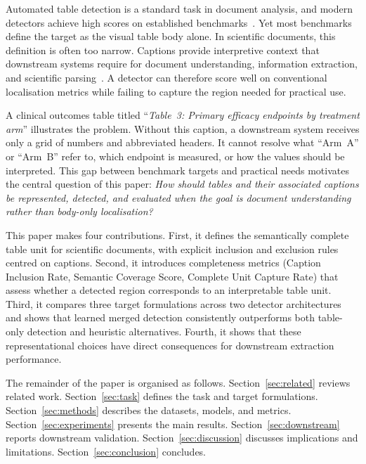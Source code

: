 \documentclass[pdflatex,sn-mathphys-num,iicol]{sn-jnl}
\begin{document}
Automated table detection is a standard task in document analysis, and modern
detectors achieve high scores on established
benchmarks~\cite{smock2022pubtables,hashmi2021survey}. Yet most benchmarks define the
target as the visual table body alone. In scientific documents, this definition is
often too narrow. Captions provide interpretive context that downstream systems
require for document understanding, information extraction, and scientific
parsing~\cite{marshall2019toward}. A detector can therefore score well on
conventional localisation metrics while failing to capture the region needed
for practical use.

A clinical outcomes table titled ``\emph{Table~3: Primary efficacy endpoints by
treatment arm}'' illustrates the problem. Without this caption, a downstream system
receives only a grid of numbers and abbreviated headers. It cannot resolve what
``Arm~A'' or ``Arm~B'' refer to, which endpoint is measured, or how the values should
be interpreted. This gap between benchmark targets and practical needs motivates the
central question of this paper: \emph{How should tables and their associated captions
be represented, detected, and evaluated when the goal is document understanding
rather than body-only localisation?}

This paper makes four contributions. First, it defines the semantically complete
table unit for scientific documents, with explicit inclusion and exclusion rules
centred on captions. Second, it introduces completeness metrics (Caption Inclusion
Rate, Semantic Coverage Score, Complete Unit Capture Rate) that assess whether a
detected region corresponds to an interpretable table unit. Third, it compares three
target formulations across two detector architectures and shows that learned merged
detection consistently outperforms both table-only detection and heuristic
alternatives. Fourth, it shows that these representational choices have direct
consequences for downstream extraction performance.

The remainder of the paper is organised as follows. Section~\ref{sec:related} reviews
related work. Section~\ref{sec:task} defines the task and target formulations.
Section~\ref{sec:methods} describes the datasets, models, and metrics.
Section~\ref{sec:experiments} presents the main results. Section~\ref{sec:downstream}
reports downstream validation. Section~\ref{sec:discussion} discusses implications
and limitations. Section~\ref{sec:conclusion} concludes.

\end{document}
